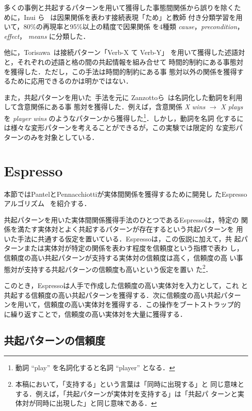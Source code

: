 \documentclass[japanese]{jnlp_1.4}
\begin{document}
多くの事例と共起するパターンを用いて獲得した事態間関係から誤りを除くた
めに，Inui ら~\cite{inui:DS03} は因果関係を表わす接続表現「ため」と教師
付き分類学習を用いて，80\%の再現率と95\%以上の精度で因果関係
を4種類 \textit{cause}，\textit{precondition}，\textit{effect}，
\textit{means} に分類した．

他に，Torisawa~\cite{torisawa:NAACL}は接続パターン「Verb-X て Verb-Y」
を用いて獲得した述語対と，それぞれの述語と格の間の共起情報を組み合せて
時間的制約にある事態対を獲得した．ただし，この手法は時間的制約にある事
態対以外の関係を獲得するために応用できるのかは明かではない．

また，共起パターンを用いた~\cite{chklovski}手法を元に
Zanzottoら~\cite{zanzotto:06}は名詞化した動詞を利用して含意関係にある事
態対を獲得した．例えば，含意関係 \textit{X wins $\rightarrow$ X plays}
を \textit{player wins} のようなパターンから獲得した\footnote{動詞
  ``play'' を名詞化すると名詞 ``player'' となる．}．しかし，動詞を名詞
化するには様々な変形パターンを考えることができるが，この実験では限定的
な変形パターンのみを対象としている．


\section{Espresso}
\label{sec:espresso}

本節ではPantelとPennacchiottiが実体間関係を獲得するために開発し
たEspressoアルゴリズム~\cite{pantel2006} を紹介する．

共起パターンを用いた実体間関係獲得手法のひとつであるEspressoは，特定の
関係を満たす実体対とよく共起するパターンが存在するという共起パターンを
用いた手法に共通する仮定を置いている．Espressoは，この仮説に加えて，共
起パターンまたは実体対が特定の関係を表わす程度を信頼度という指標で表わ
し，信頼度の高い共起パターンが支持する実体対の信頼度は高く，信頼度の高
い事態対が支持する共起パターンの信頼度も高いという仮定を置い
た\footnote{本稿において，「支持する」という言葉は「同時に出現する」と
  同じ意味とする．例えば，「共起パターンが実体対を支持する」は「共起パ
    ターンと実体対が同時に出現した」と同じ意味である．}．

このとき，Espressoは人手で作成した信頼度の高い実体対を入力として，これ
と共起する信頼度の高い共起パターンを獲得する．次に信頼度の高い共起パター
ンを用いて，信頼度の高い実体対を獲得する．この操作をブートストラップ的
に繰り返すことで，信頼度の高い実体対を大量に獲得する．


\subsection{共起パターンの信頼度}
\label{ssec:equation}
\end{document}
